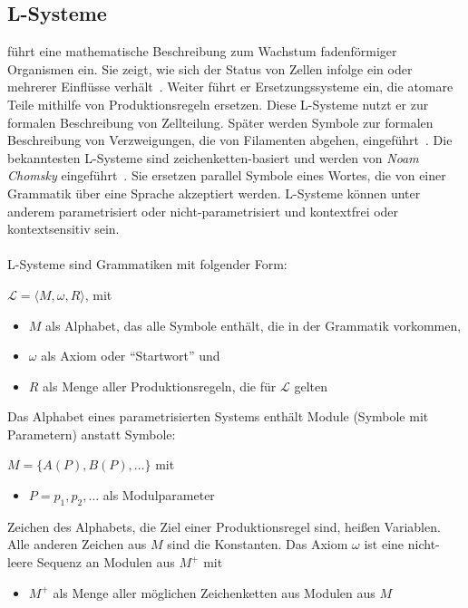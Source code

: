 \subsection*{L-Systeme}
\citeauthor{lindemayer_1968} führt eine mathematische Beschreibung zum Wachstum fadenförmiger Organismen ein.
Sie zeigt, wie sich der Status von Zellen infolge ein oder mehrerer Einflüsse verhält~\cite{lindemayer_1968}.
Weiter führt er Ersetzungssysteme ein, die atomare Teile mithilfe von Produktionsregeln ersetzen.
Diese L-Systeme nutzt er zur formalen Beschreibung von Zellteilung.
Später werden Symbole zur formalen Beschreibung von Verzweigungen, die von Filamenten abgehen, eingeführt~\cite{prusinkiewicz_1990}.
Die bekanntesten L-Systeme sind zeichenketten-basiert und werden von \textit{Noam Chomsky} eingeführt~\cite{chomsky_1956}.
Sie ersetzen parallel Symbole eines Wortes, die von einer Grammatik über eine Sprache akzeptiert werden.
L-Systeme können unter anderem parametrisiert oder nicht-parametrisiert und kontextfrei oder kontextsensitiv sein.\\~\\
L-Systeme sind Grammatiken mit folgender Form:
\begin{center}
    $\mathcal{L}=\langle M,\omega,R \rangle$, mit
    \begin{itemize}
        \item $M$ als Alphabet, das alle Symbole enthält, die in der Grammatik vorkommen,
        \item $\omega$ als Axiom oder "`Startwort"' und
        \item $R$ als Menge aller Produktionsregeln, die für $\mathcal{L}$ gelten
    \end{itemize}
\end{center}
Das Alphabet eines parametrisierten Systems enthält Module (Symbole mit Parametern) anstatt Symbole:
\begin{center}
    $M=\{A(P),B(P),\dots\}$ mit
    \begin{itemize}
        \item $P=p_1,p_2,\dots$ als Modulparameter
    \end{itemize}
\end{center}
Zeichen des Alphabets, die Ziel einer Produktionsregel sind, heißen Variablen.
Alle anderen Zeichen aus $M$ sind die Konstanten.
Das Axiom $\omega$ ist eine nicht-leere Sequenz an Modulen aus $M^+$ mit
\begin{itemize}
    \item $M^+$ als Menge aller möglichen Zeichenketten aus Modulen aus $M$
\end{itemize}
